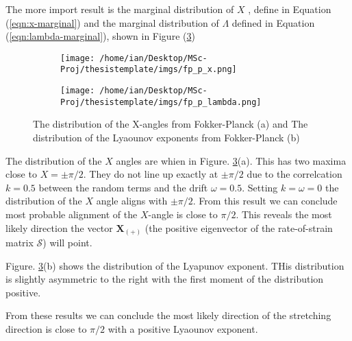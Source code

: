The more import result is the marginal distribution of $X$ , define in Equation (\ref{eqn:x-marginal}) and the marginal distribution of $\Lambda$ defined in Equation (\ref{eqn:lambda-marginal}), shown in Figure (\ref{fig:fp-single-marginals})

\begin{figure}[ht]
\begin{subfigure}{.5\textwidth}
  \centering
  \texttt{[image: /home/ian/Desktop/MSc-Proj/thesistemplate/imgs/fp\_p\_x.png]}
  \caption{}
  \label{}
\end{subfigure}
\begin{subfigure}{.5\textwidth}
  \centering
  \texttt{[image: /home/ian/Desktop/MSc-Proj/thesistemplate/imgs/fp\_p\_lambda.png]}
  \caption{}
  \label{}
\end{subfigure}
\caption{The distribution of the X-angles from Fokker-Planck (a) and The distribution of the Lyaounov exponents from Fokker-Planck (b)}
\label{fig:fp-single-marginals}
\end{figure}

The distribution of the $X$ angles are whien in Figure. \ref{fig:fp-single-marginals}(a). This has two maxima close to $X = \pm \pi/2$. They do not line up exactly at $\pm \pi/2$ due to the correlcation $k = 0.5$ between the random terms and the drift $\omega = 0.5$.
Setting $ k = \omega = 0$ the distribution of the $X$ angle aligns with $\pm \pi/2$. From this result we can conclude most probable alignment of the $X$-angle is close to $\pi/2$. 
This reveals the most likely direction the vector $\mathbf{X}_{(+)}$ (the positive eigenvector of the rate-of-strain matrix $\mathcal{S}$) will point.

Figure. \ref{fig:fp-single-marginals}(b) shows the distribution of the Lyapunov exponent. THis distribution is slightly asymmetric to the right with the first moment of the distribution positive. 

From these results we can conclude the most likely direction of the stretching direction is close to $\pi/2$ with a positive Lyaounov exponent.
